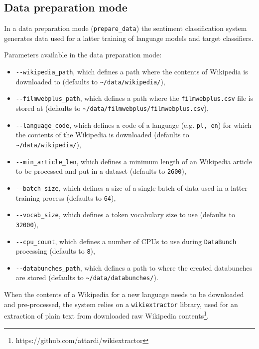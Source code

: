 \subsection{Data preparation mode}
\label{dataprep}

In a data preparation mode (\lstinline{prepare_data}) the sentiment classification system generates data used for a latter training of language models and target classifiers.

Parameters available in the data preparation mode:

\begin{itemize}
    \item \lstinline{--wikipedia_path}, which defines a path where the contents of Wikipedia is downloaded to (defaults to \lstinline{~/data/wikipedia/}),
    \item \lstinline{--filmwebplus_path}, which defines a path where the \lstinline{filmwebplus.csv} file is stored at (defaults to \lstinline{~/data/filmwebplus/filmwebplus.csv}),
    \item \lstinline{--language_code}, which defines a code of a language (e.g. \lstinline{pl, en}) for which the contents of the Wikipedia is downloaded (defaults to \lstinline{~/data/wikipedia/}),
    \item \lstinline{--min_article_len}, which defines a minimum length of an Wikipedia article to be processed and put in a dataset (defaults to \lstinline{2600}),
    \item \lstinline{--batch_size}, which defines a size of a single batch of data used in a latter training process (defaults to \lstinline{64}),
    \item \lstinline{--vocab_size}, which defines a token vocabulary size to use (defaults to \lstinline{32000}),
    \item \lstinline{--cpu_count}, which defines a number of CPUs to use during \lstinline{DataBunch} processing (defaults to \lstinline{8}),
    \item \lstinline{--databunches_path}, which defines a path to where the created databunches are stored (defaults to \lstinline{~/data/databunches/}).
    
\end{itemize}
When the contents of a Wikipedia for a new language needs to be downloaded and pre-processed, the system relies on a \lstinline{wikiextractor} library, used for an extraction of plain text from downloaded raw Wikipedia contents\footnote{https://github.com/attardi/wikiextractor}.

